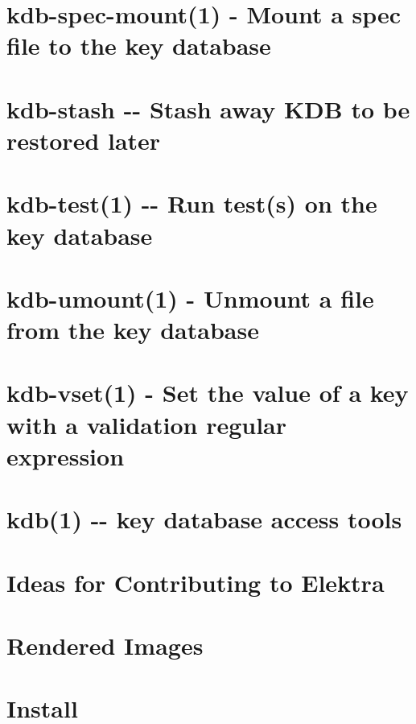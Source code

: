 \documentclass[twoside]{book}
\newcommand{\+}{\discretionary{\mbox{\scriptsize$\hookleftarrow$}}{}{}}
\begin{document}
\chapter{kdb-\/spec-\/mount(1) -\/ Mount a spec file to the key database}
\label{md_doc_help_kdb-spec-mount}

\chapter{kdb-\/stash -\/-\/ Stash away K\+DB to be restored later}
\label{md_doc_help_kdb-stash}

\chapter{kdb-\/test(1) -\/-\/ Run test(s) on the key database}
\label{md_doc_help_kdb-test}

\chapter{kdb-\/umount(1) -\/ Unmount a file from the key database}
\label{md_doc_help_kdb-umount}

\chapter{kdb-\/vset(1) -\/ Set the value of a key with a validation regular expression}
\label{md_doc_help_kdb-vset}

\chapter{kdb(1) -\/-\/ key database access tools}
\label{md_doc_help_kdb}

\chapter{Ideas for Contributing to Elektra}
\label{doc_IDEAS_md}

\chapter{Rendered Images}
\label{doc_images_README_md}

\chapter{Install}
\label{doc_INSTALL_md}

\end{document}
